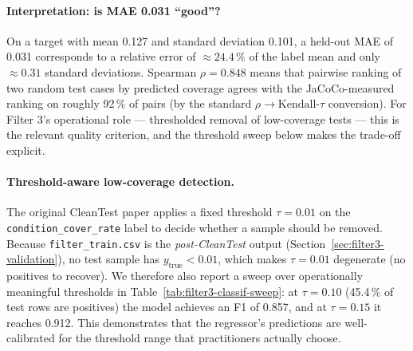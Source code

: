 \documentclass[acmlarge,nonacm,screen]{acmart}
\begin{document}
\paragraph{Interpretation: is MAE 0.031 ``good''?}
On a target with mean 0.127 and standard deviation 0.101, a held-out
MAE of 0.031 corresponds to a relative error of $\approx 24.4$\,\%
of the label mean and only $\approx 0.31$ standard deviations.
Spearman $\rho = 0.848$ means that pairwise ranking of two random
test cases by predicted coverage agrees with the JaCoCo-measured
ranking on roughly 92\,\% of pairs (by the standard
$\rho \to \text{Kendall-}\tau$ conversion). For Filter 3's
operational role --- thresholded removal of low-coverage tests ---
this is the relevant quality criterion, and the threshold sweep
below makes the trade-off explicit.

\paragraph{Threshold-aware low-coverage detection.} The original
CleanTest paper applies a fixed threshold $\tau = 0.01$ on the
\texttt{condition\_cover\_rate} label to decide whether a sample
should be removed. Because \texttt{filter\_train.csv} is the
\textit{post-CleanTest} output (Section~\ref{sec:filter3-validation}),
no test sample has $y_{\text{true}} < 0.01$, which makes
$\tau = 0.01$ degenerate (no positives to recover). We therefore
also report a sweep over operationally meaningful thresholds in
Table~\ref{tab:filter3-classif-sweep}: at $\tau = 0.10$ (45.4\,\%
of test rows are positives) the model achieves an F1 of 0.857, and
at $\tau = 0.15$ it reaches 0.912. This demonstrates that the
regressor's predictions are well-calibrated for the threshold range
that practitioners actually choose.
\end{document}
